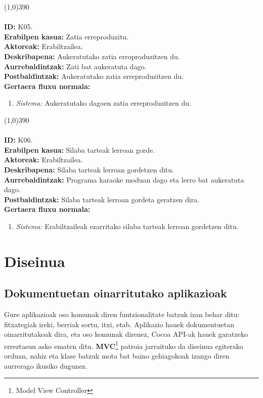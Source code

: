 \line(1,0){390}\\
\noindent\\
\textbf{ID:} K05.\\
\textbf{Erabilpen kasua:} Zatia erreproduzitu.\\
\textbf{Aktoreak:} Erabiltzailea.\\
\textbf{Deskribapena:} Aukeratutako zatia erroproduzitzen du.\\
\textbf{Aurrebaldintzak:} Zati bat aukeratuta dago.\\
\textbf{Postbaldintzak:} Aukeratutako zatia erreproduzitzen du.\\
\textbf{Gertaera fluxu normala:}
\begin{enumerate}
	\item \textit{Sistema:} Aukeratutako dagoen zatia erreproduzitzen du.
\end{enumerate}
\line(1,0){390}\\
\noindent\\
\textbf{ID:} K06.\\
\textbf{Erabilpen kasua:} Silaba tarteak lerroan gorde.\\
\textbf{Aktoreak:} Erabiltzailea.\\
\textbf{Deskribapena:} Silaba tarteak lerroan gordetzen ditu.\\
\textbf{Aurrebaldintzak:} Programa karaoke moduan dago eta lerro bat aukeratuta dago.\\
\textbf{Postbaldintzak:} Silaba tarteak lerroan gordeta geratzen dira.\\
\textbf{Gertaera fluxu normala:}
\begin{enumerate}
	\item \textit{Sistema:} Erabiltzaileak ezarritako silaba tarteak lerroan gordetzen ditu.
\end{enumerate}

\section{Diseinua}
\subsection{Dokumentuetan oinarritutako aplikazioak}
Gure aplikazioak oso komunak diren funtzionalitate batzuk izan behar ditu: fitxategiak ireki, berriak sortu, itxi, etab. Aplikazio hauek dokumentuetan oinarritutakoak dira, eta oso komunak direnez, Cocoa API-ak hauek garatzeko erreztasun asko ematen ditu. \textbf{MVC}\footnote{Model View Controller} patroia jarraituko da diseinua egiterako orduan, nahiz eta klase batzuk mota bat baino gehiagokoak izango diren aurrerago ikusiko dugunez.
